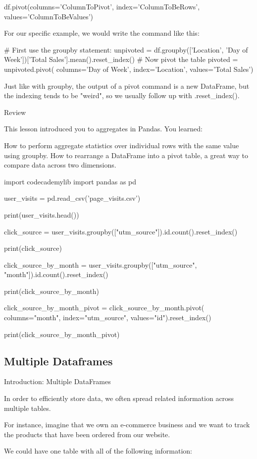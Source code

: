 \documentclass{journal}
\begin{document}
df.pivot(columns='ColumnToPivot',
         index='ColumnToBeRows',
         values='ColumnToBeValues')

For our specific example, we would write the command like this:

# First use the groupby statement:
unpivoted = df.groupby(['Location', 'Day of Week'])['Total Sales'].mean().reset_index()
# Now pivot the table
pivoted = unpivoted.pivot(
    columns='Day of Week',
    index='Location',
    values='Total Sales')

Just like with groupby, the output of a pivot command is a new DataFrame, but the indexing tends to be "weird", so we usually follow up with .reset_index().

Review

This lesson introduced you to aggregates in Pandas. You learned:

    How to perform aggregate statistics over individual rows with the same value using groupby.
    How to rearrange a DataFrame into a pivot table, a great way to compare data across two dimensions.

import codecademylib
import pandas as pd

user_visits = pd.read_csv('page_visits.csv')

print(user_visits.head())

click_source = user_visits.groupby(["utm_source"]).id.count().reset_index()

print(click_source)

click_source_by_month = user_visits.groupby(["utm_source", "month"]).id.count().reset_index()

print(click_source_by_month)

click_source_by_month_pivot = click_source_by_month.pivot(
  columns="month",
  index="utm_source",
  values="id").reset_index()

print(click_source_by_month_pivot)

\subsection{Multiple Dataframes}
Introduction: Multiple DataFrames

In order to efficiently store data, we often spread related information across multiple tables.

For instance, imagine that we own an e-commerce business and we want to track the products that have been ordered from our website.

We could have one table with all of the following information:
\end{document}
